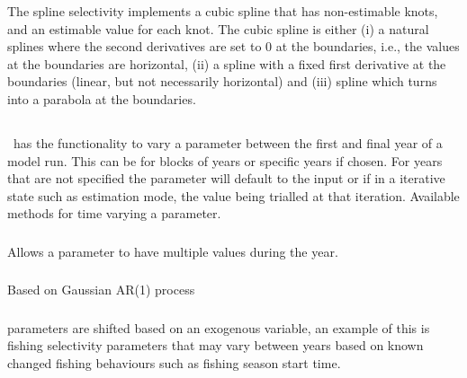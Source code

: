 The spline selectivity implements a cubic spline that has non-estimable knots, and an estimable value for each knot. The cubic spline is either (i) a natural splines where the second derivatives are set to 0 at the boundaries, i.e., the values at the boundaries are horizontal, (ii) a spline with a fixed first derivative at the boundaries (linear, but not necessarily horizontal) and (iii) spline which turns into a parabola at the boundaries.


\subsection{\label{sec:time_var}}

\CNAME\ has the functionality to vary a parameter between the first and final year of a model run. This can be for blocks of years or specific years if chosen. For years that are not specified the parameter will default to the input or if in a iterative state such as estimation mode, the value being trialled at that iteration. Available methods for time varying a parameter.


\subsubsection[Constant]{}
Allows a parameter to have multiple values during the year.

\subsubsection[Random Walk]{}
Based on Gaussian AR(1) process

\subsubsection[Exogenous]{}
parameters are shifted based on an exogenous variable, an example of this is fishing selectivity parameters that may vary between years based on known changed fishing behaviours such as fishing season start time.



